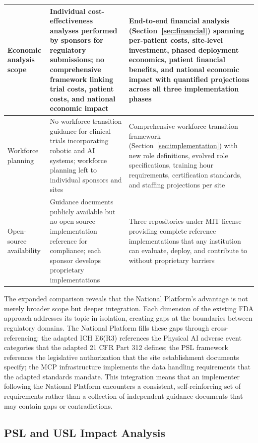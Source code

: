 \begin{longtable}{p{2.5cm} p{4.5cm} p{5.5cm}}
\midrule
Economic analysis scope & Individual cost-effectiveness analyses performed by sponsors for regulatory submissions; no comprehensive framework linking trial costs, patient costs, and national economic impact & End-to-end financial analysis (Section~\ref{sec:financial}) spanning per-patient costs, site-level investment, phased deployment economics, patient financial benefits, and national economic impact with quantified projections across all three implementation phases \\
\midrule
Workforce planning & No workforce transition guidance for clinical trials incorporating robotic and AI systems; workforce planning left to individual sponsors and sites & Comprehensive workforce transition framework (Section~\ref{sec:implementation}) with new role definitions, evolved role specifications, training hour requirements, certification standards, and staffing projections per site \\
\midrule
Open-source availability & Guidance documents publicly available but no open-source implementation reference for compliance; each sponsor develops proprietary implementations & Three repositories under MIT license \cite{main-repo, mcp-repo, fl-repo} providing complete reference implementations that any institution can evaluate, deploy, and contribute to without proprietary barriers \\
\end{longtable}

The expanded comparison reveals that the National Platform's advantage is not
merely broader scope but deeper integration. Each dimension of the existing
FDA approach addresses its topic in isolation, creating gaps at the boundaries
between regulatory domains. The National Platform fills these gaps through
cross-referencing: the adapted ICH E6(R3) references the Physical AI adverse
event categories that the adapted 21 CFR Part 312 defines; the PSL framework
references the legislative authorization that the site establishment documents
specify; the MCP infrastructure implements the data handling requirements that
the adapted standards mandate. This integration means that an implementer
following the National Platform encounters a consistent, self-reinforcing set
of requirements rather than a collection of independent guidance documents
that may contain gaps or contradictions.

\subsection{PSL and USL Impact Analysis}
\label{subsec:discuss-psl-usl-impact}

